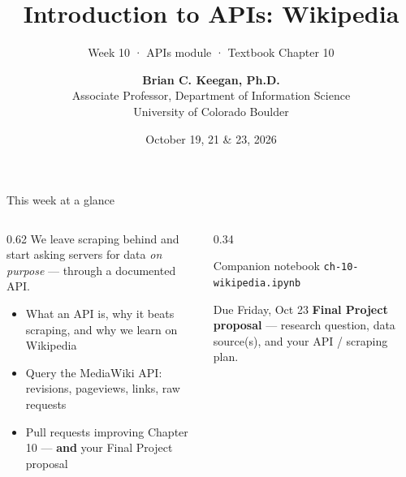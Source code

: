 \documentclass[9pt,aspectratio=169]{beamer}
\title[Week 10 · Wikipedia API]{{\Huge Introduction to APIs: Wikipedia}}
\subtitle{Week 10 · APIs module · Textbook Chapter 10}
\author[Keegan]{\textbf{Brian C. Keegan, Ph.D.} \\ Associate Professor, Department of Information Science \\ University of Colorado Boulder}
\date{October 19, 21 \& 23, 2026}
\begin{document}
\maketitle

\begin{frame}{This week at a glance}
    \begin{columns}[T]
        \begin{column}{0.62\textwidth}
            We leave scraping behind and start asking servers for data \textit{on purpose} --- through a documented API.

            \vspace{0.8em}

            \begin{itemize}\small
                \item What an API is, why it beats scraping, and why we learn on Wikipedia
            \end{itemize}

            \vspace{0.4em}

            \begin{itemize}\small
                \item Query the MediaWiki API: revisions, pageviews, links, raw requests
            \end{itemize}

            \vspace{0.4em}

            \begin{itemize}\small
                \item Pull requests improving Chapter 10 --- \textbf{and} your Final Project proposal
            \end{itemize}
        \end{column}
        \begin{column}{0.34\textwidth}
            \begin{block}{Companion notebook}
                \footnotesize \texttt{ch-10-wikipedia.ipynb}
            \end{block}
            \begin{alertblock}{Due Friday, Oct 23}
                \footnotesize \textbf{Final Project proposal} --- research question, data source(s), and your API / scraping plan.
            \end{alertblock}
        \end{column}
    \end{columns}
\end{frame}
\end{document}
